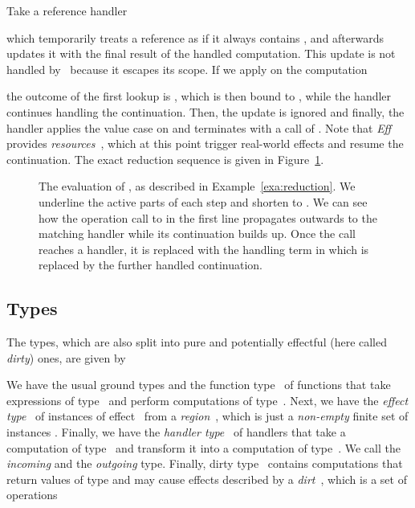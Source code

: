 \documentclass{LMCS}
\newcommand{\Eff}{\emph{Eff}\xspace}
\begin{document}
\begin{exa}
\label{exa:reduction}
Take a reference handler

which temporarily treats a reference  as if it always contains ,
and afterwards updates it with the final result of the handled computation.
This update is not handled by~ because it escapes its scope.
If we apply  on the computation

the outcome of the first lookup is , which is then bound to ,
while the handler continues handling the continuation.
Then, the update is ignored and finally,
the handler applies the value case on  and terminates with a call of .
Note that \Eff provides \emph{resources}~\cite{bauer2012programming},
which at this point trigger real-world effects and resume the continuation.
The exact reduction sequence is given in Figure~\ref{fig:reduction}.
\end{exa}

\begin{figure}[h]
\hrulefill
  \small
\newcommand{\hilite}{\underline}

\caption{
  The evaluation of , as described in Example~\ref{exa:reduction}.
  We underline the active parts of each step and shorten  to .
  We can see how the operation call to  in the first line propagates
  outwards to the matching handler while its continuation builds up.
  Once the call reaches a handler, it is replaced with the handling term
  in which  is replaced by the further handled continuation.}
\label{fig:reduction}
\hrulefill
\end{figure}

\subsection{Types}
\label{sub:types}

The types, which are also split into pure and potentially effectful (here called \emph{dirty}) ones, are given by

We have the usual ground types and the function type~
of functions that take expressions of type~ and perform computations of type~.
Next, we have the \emph{effect type}~ of instances of effect~ from a \emph{region}~,
which is just a \emph{non-empty} finite set of instances .
Finally, we have the \emph{handler type}~ of handlers that take a computation of type~ and transform it into a computation of type~.
We call  the \emph{incoming} and  the \emph{outgoing} type.
Finally, dirty type~ contains computations that
return values of type  and may cause effects described by a \emph{dirt}~,
which is a set of operations
\end{document}
